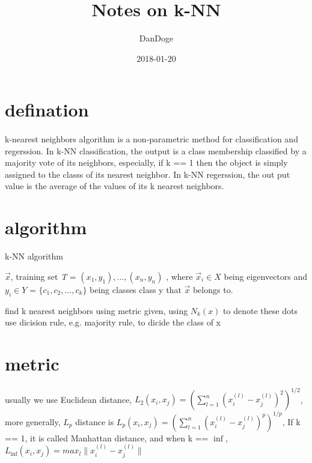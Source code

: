 \documentclass{article}
\title{Notes on k-NN}
\date{2018-01-20}
\author{DanDoge}
\begin{document}
\section{defination}
  \paragraph{}
    k-nearest neighbors algorithm is a non-parametric method for classification and regerssion.  In k-NN classification, the output is a class membership classified by a majority vote of its neighbors, especially, if k == 1 then the object is simply assigned to the classs of its nearest neighbor. In k-NN regerssion, the out put value is the average of the values of its k nearest neighbors.

\section{algorithm}
  \begin{algorithm}
    \caption{k-NN algorithm}
    \hspace*{0.02in}{\bf Input:} $\vec x$, training set \textit{T} = ${(x_1, y_1), ..., (x_n, y_n)}$ , where $\vec x_i \in \textit{X}$ being eigenvectors and $y_i \in \textit{Y}$ = $\{c_1, c_2, ..., c_k\}$ being classes
    \newline{}
    \hspace*{0.02in}{\bf Output:} class y that $\vec x$ belongs to.
    \begin{algorithmic}[1]
      \State find k nearest neighbors using metric given, using $N_k(x)$ to denote these dots
      \State use dicision rule, e.g. majority rule, to dicide the class of x
    \end{algorithmic}
  \end{algorithm}

\section{metric}
  \paragraph{}
    usually we use Euclidean distance, $L_2(x_i, x_j) = (\sum_{l = 1}^{n}(x_i^{(l)} - x_j^{(l)})^{2})^{1/2}$, more generally, $\textit{L}_p$ distance is $L_p(x_i, x_j) = (\sum_{l = 1}^{n}(x_i^{(l)} - x_j^{(l)})^{p})^{1/p}$, If k == 1, it is called Manhattan distance, and when k == $\inf$, $L_{\inf}(x_i, x_j) = max_{l} \|x_i^{(l)} - x_j^{(l)}\|$
\end{document}
